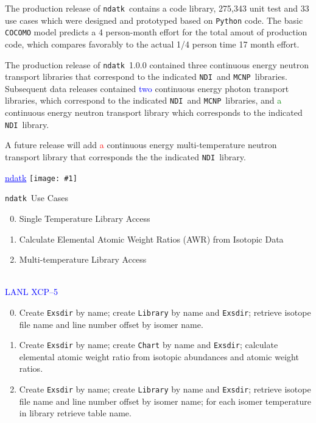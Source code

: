 \documentclass[clock]{slides}
\newenvironment{xslide}[1][logo.jpg]{\begin{slide} \tiny
\textcolor{blue}{\underline{ndatk}} \hfill
\texttt{[image: \#1]}
\normalsize}{\vfill\tiny
\textcolor{blue}{\hrulefill \\LANL XCP--5}
\end{slide}}
\newcommand{\ndatk}{\texttt{ndatk}}
\newcommand{\NDI}{\texttt{NDI}}
\newcommand{\MCNP}{\texttt{MCNP}}
\begin{document}
\begin{note}\small
The production release of \ndatk\ contains a code library,
275,343 unit test and 33 use cases which were designed and prototyped
based on \texttt{Python} code.  The basic \texttt{COCOMO} model
predicts a 4 person-month effort for the total amout of production
code, which compares favorably to the actual 1/4 person time 17 month
effort.

The production release of \ndatk\ 1.0.0 contained three
continuous energy neutron transport libraries that correspond to the
indicated \NDI\ and \MCNP\ libraries.  Subsequent data
releases contained \textcolor{blue}{two} continuous energy photon
transport libraries, which correspond to the indicated \NDI\
and \MCNP\ libraries, and \textcolor{green}{a} continuous
energy neutron transport library which corresponds to the indicated
\NDI\ library.

A future release will add \textcolor{red}{a} continuous energy
multi-temperature neutron transport library that corresponds the the
indicated \NDI\ library.
\end{note}

\begin{xslide}
\begin{center}\Large
\ndatk\ Use Cases
\end{center}
\begin{enumerate}
\setcounter{enumi}{-1}
\item Single Temperature Library Access
\item Calculate Elemental Atomic Weight Ratios (AWR) from Isotopic
  Data
\item Multi-temperature Library Access
\end{enumerate}
\end{xslide}

\begin{note}\small
\begin{enumerate}
\setcounter{enumi}{-1}
\item Create \texttt{Exsdir} by name; create \texttt{Library} by name
  and \texttt{Exsdir}; retrieve isotope file name and line number
  offset by isomer name.

\item Create \texttt{Exsdir} by name; create \texttt{Chart} by name
  and \texttt{Exsdir}; calculate elemental atomic weight ratio from
  isotopic abundances and atomic weight ratios.

\item Create \texttt{Exsdir} by name; create \texttt{Library} by name
  and \texttt{Exsdir}; retrieve isotope file name and line number
  offset by isomer name; for each isomer temperature in library
  retrieve table name.
\end{enumerate}

\end{note}
\end{document}
